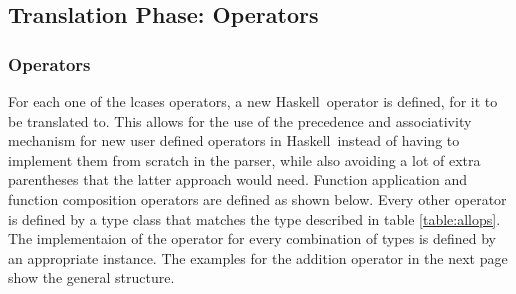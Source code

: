 \documentclass{article}
\def\H{Haskell}
\begin{document}
\subsection{Translation Phase: Operators}

\subsubsection{Operators}

For each one of the lcases operators, a new \H\ operator is defined, for it to
be translated to. This allows for the use of the precedence and associativity
mechanism for new user defined operators in \H\ instead of having to implement
them from scratch in the parser, while also avoiding a lot of extra parentheses
that the latter approach would need. Function application and function
composition operators are defined as shown below. Every other operator is
defined by a type class that matches the type described in table
\ref{table:allops}. The implementaion of the operator for every combination of
types is defined by an appropriate instance. The examples for the addition
operator in the next page show the general structure.
\\
\end{document}
